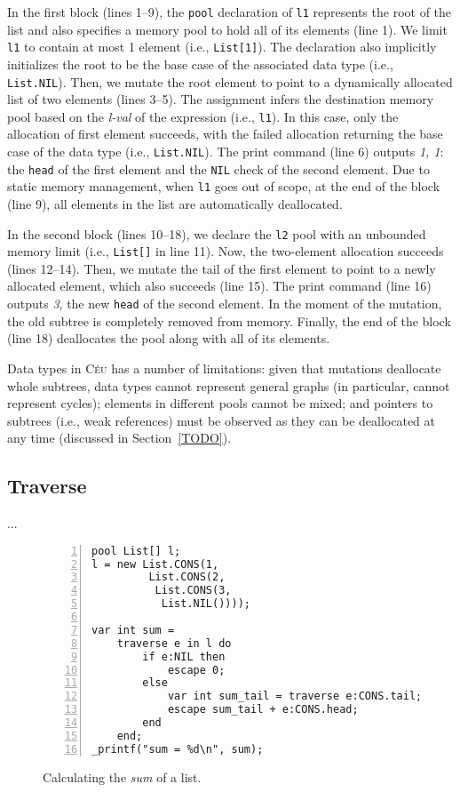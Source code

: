 \documentclass{acm_proc_article-sp}
\newcommand{\CEU}{\textsc{C\'{e}u}\xspace}
\newcommand{\code}[1] {{\small{\texttt{#1}}}}
\begin{document}
In the first block (lines 1--9), the \code{pool} declaration of \code{l1} 
represents the root of the list and also specifies a memory pool to hold all of 
its elements (line 1).
We limit \code{l1} to contain at most 1 element (i.e., \code{List[1]}).
The declaration also implicitly initializes the root to be the base case of the 
associated data type (i.e., \code{List.NIL}).
Then, we mutate the root element to point to a dynamically allocated list of 
two elements (lines 3--5).
The assignment infers the destination memory pool based on the \emph{l-val} of 
the expression (i.e., \code{l1}).
In this case, only the allocation of first element succeeds, with the failed 
allocation returning the base case of the data type (i.e., \code{List.NIL}).
The print command (line 6) outputs \emph{1, 1}: the \code{head} of the first 
element and the \code{NIL} check of the second element.
Due to static memory management, when \code{l1} goes out of scope, at the end 
of the block (line 9), all elements in the list are automatically deallocated.

In the second block (lines 10--18), we declare the \code{l2} pool with an
unbounded memory limit (i.e., \code{List[]} in line 11).
Now, the two-element allocation succeeds (lines 12--14).
Then, we mutate the tail of the first element to point to a newly allocated 
element, which also succeeds (line 15).
The print command (line 16) outputs \emph{3}, the new \code{head} of the second 
element.
In the moment of the mutation, the old subtree is completely removed from 
memory.
Finally, the end of the block (line 18) deallocates the pool along with all of 
its elements.


Data types in \CEU has a number of limitations:
given that mutations deallocate whole subtrees, data types cannot represent 
general graphs (in particular, cannot represent cycles);
elements in different pools cannot be mixed;
and pointers to subtrees (i.e., weak references) must be observed as they can 
be deallocated at any time (discussed in Section~\ref{TODO}).

\subsection{Traverse}

...

\begin{figure}%
\begin{lstlisting}[numbers=left,xleftmargin=3em]
pool List[] l;
l = new List.CONS(1,
         List.CONS(2,
          List.CONS(3,
           List.NIL())));

var int sum =
    traverse e in l do
        if e:NIL then
            escape 0;
        else
            var int sum_tail = traverse e:CONS.tail;
            escape sum_tail + e:CONS.head;
        end
    end;
_printf("sum = %d\n", sum);
\end{lstlisting}
\caption{
Calculating the \emph{sum} of a list.
\label{lst.sum}
}
\end{figure}
\end{document}

